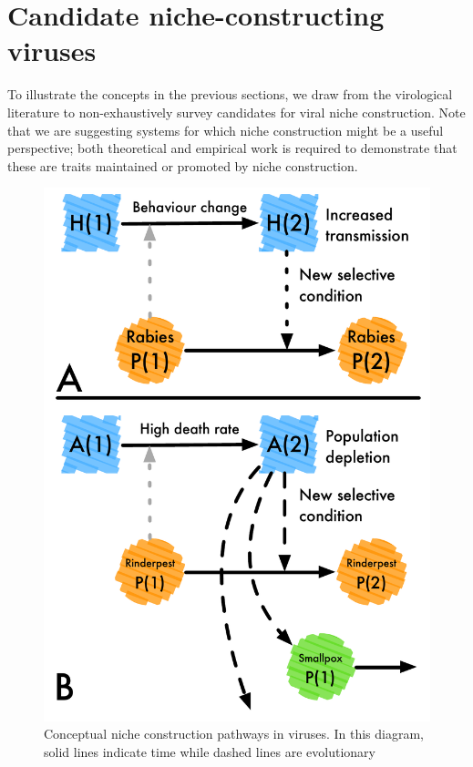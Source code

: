 \documentclass[review,draft,12pt]{elsarticle}
\begin{document}
\section{Candidate niche-constructing
viruses}\label{candidate-niche-constructing-viruses}

To illustrate the concepts in the previous sections, we draw from the
virological literature to non-exhaustively survey candidates for viral
niche construction. Note that we are suggesting systems for which niche
construction might be a useful perspective; both theoretical and
empirical work is required to demonstrate that these are traits
maintained or promoted by niche construction.

\begin{figure}[htbp]
\centering
\includegraphics{Figures/VNC-02-Figure2.pdf}
\caption{Conceptual niche construction pathways in viruses. In this
diagram, solid lines indicate time while dashed lines are evolutionary
}
\end{figure}
\end{document}
